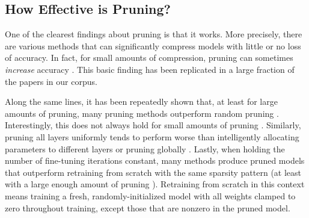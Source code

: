 
\vspace{-1mm}
\subsection{How Effective is Pruning?}
\vspace{-.25mm}

One of the clearest findings about pruning is that it works. More precisely, there are various methods that can significantly compress models with little or no loss of accuracy. In fact, for small amounts of compression, pruning can sometimes \textit{increase} accuracy \cite{learning-both, spectral-pruning}. This basic finding has been replicated in a large fraction of the papers in our corpus. %

Along the same lines, it has been repeatedly shown that, at least for large amounts of pruning, many pruning methods outperform random pruning \cite{nisp, google-state-of-sparsity, lottery-ticket-followup, divnet, apple-pfa, channel-lasso-lstsq}. Interestingly, this does not always hold for small amounts of pruning \cite{lottery-transfer}. Similarly, pruning all layers uniformly tends to perform worse than intelligently allocating parameters to different layers \cite{google-state-of-sparsity, learning-both, pruning-filters, nvidia-taylor-pruning, thinet-channel-norms} or pruning globally \cite{snip, lottery-ticket}. Lastly, when holding the number of fine-tuning iterations constant, many methods produce pruned models that outperform retraining from scratch with the same sparsity pattern \cite{zhang-accel-very-deep, nisp, bayesian-compression, channel-lasso-lstsq, thinet-channel-norms, lottery-ticket} (at least with a large enough amount of pruning \cite{apple-pfa}). Retraining from scratch in this context means training a fresh, randomly-initialized model with all weights clamped to zero throughout training, except those that are nonzero in the pruned model.


